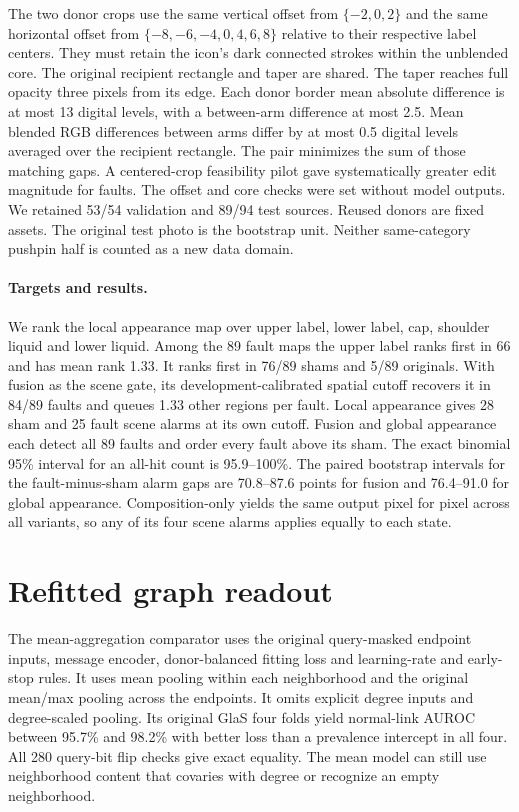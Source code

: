 \documentclass[10pt,twocolumn,letterpaper]{article}
\begin{document}
The two donor crops use the same vertical offset from $\{-2,0,2\}$ and the same horizontal offset from $\{-8,-6,-4,0,4,6,8\}$ relative to their respective label centers. They must retain the icon's dark connected strokes within the unblended core. The original recipient rectangle and taper are shared. The taper reaches full opacity three pixels from its edge. Each donor border mean absolute difference is at most 13 digital levels, with a between-arm difference at most 2.5. Mean blended RGB differences between arms differ by at most 0.5 digital levels averaged over the recipient rectangle. The pair minimizes the sum of those matching gaps. A centered-crop feasibility pilot gave systematically greater edit magnitude for faults. The offset and core checks were set without model outputs. We retained 53/54 validation and 89/94 test sources. Reused donors are fixed assets. The original test photo is the bootstrap unit. Neither same-category pushpin half is counted as a new data domain.

\paragraph{Targets and results.}
We rank the local appearance map over upper label, lower label, cap, shoulder liquid and lower liquid. Among the 89 fault maps the upper label ranks first in 66 and has mean rank 1.33. It ranks first in 76/89 shams and 5/89 originals. With fusion as the scene gate, its development-calibrated spatial cutoff recovers it in 84/89 faults and queues 1.33 other regions per fault. Local appearance gives 28 sham and 25 fault scene alarms at its own cutoff. Fusion and global appearance each detect all 89 faults and order every fault above its sham. The exact binomial 95\% interval for an all-hit count is 95.9--100\%. The paired bootstrap intervals for the fault-minus-sham alarm gaps are 70.8--87.6 points for fusion and 76.4--91.0 for global appearance. Composition-only yields the same output pixel for pixel across all variants, so any of its four scene alarms applies equally to each state.

\section{Refitted graph readout}
The mean-aggregation comparator uses the original query-masked endpoint inputs, message encoder, donor-balanced fitting loss and learning-rate and early-stop rules. It uses mean pooling within each neighborhood and the original mean/max pooling across the endpoints. It omits explicit degree inputs and degree-scaled pooling. Its original GlaS four folds yield normal-link AUROC between 95.7\% and 98.2\% with better loss than a prevalence intercept in all four. All 280 query-bit flip checks give exact equality. The mean model can still use neighborhood content that covaries with degree or recognize an empty neighborhood.
\end{document}
